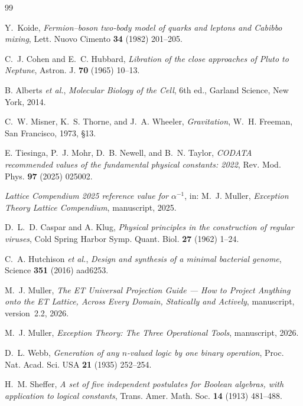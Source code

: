 \documentclass[11pt,a4paper]{article}
\theoremstyle{definition}
\theoremstyle{remark}
\begin{document}
\begin{thebibliography}{99}

Y.~Koide,
\emph{Fermion--boson two-body model of quarks and leptons and Cabibbo mixing},
Lett. Nuovo Cimento {\bf 34} (1982) 201--205.

C.~J. Cohen and E.~C. Hubbard,
\emph{Libration of the close approaches of Pluto to Neptune},
Astron. J. {\bf 70} (1965) 10--13.

B. Alberts \emph{et al.},
\emph{Molecular Biology of the Cell}, 6th ed., Garland Science, New York, 2014.

C.~W. Misner, K.~S. Thorne, and J.~A. Wheeler,
\emph{Gravitation}, W.~H. Freeman, San Francisco, 1973, \S 13.

E. Tiesinga, P.~J. Mohr, D.~B. Newell, and B.~N. Taylor,
\emph{CODATA recommended values of the fundamental physical constants: 2022},
Rev. Mod. Phys. {\bf 97} (2025) 025002.

\emph{Lattice Compendium 2025 reference value for $\alpha^{-1}$}, in: M.~J. Muller, \emph{Exception Theory Lattice Compendium}, manuscript, 2025.

D.~L.~D. Caspar and A. Klug,
\emph{Physical principles in the construction of regular viruses},
Cold Spring Harbor Symp. Quant. Biol. {\bf 27} (1962) 1--24.

C.~A. Hutchison \emph{et al.},
\emph{Design and synthesis of a minimal bacterial genome},
Science {\bf 351} (2016) aad6253.

M.~J. Muller,
\emph{The ET Universal Projection Guide --- How to Project Anything onto the ET Lattice, Across Every Domain, Statically and Actively}, manuscript, version~2.2, 2026.

M.~J. Muller,
\emph{Exception Theory: The Three Operational Tools}, manuscript, 2026.

D.~L. Webb,
\emph{Generation of any $n$-valued logic by one binary operation},
Proc. Nat. Acad. Sci. USA {\bf 21} (1935) 252--254.

H.~M. Sheffer,
\emph{A set of five independent postulates for Boolean algebras, with application to logical constants},
Trans. Amer. Math. Soc. {\bf 14} (1913) 481--488.

\end{thebibliography}
\end{document}
